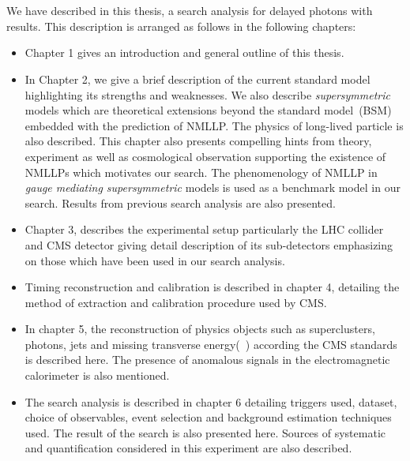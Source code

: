 \paragraph*{} \mbox{}\\
We have described in this thesis, a search analysis for delayed photons with results. This description is arranged as follows in the following chapters: 
\begin{itemize}
\item Chapter 1 gives an introduction and general outline of this thesis. 

\item In Chapter 2, we give a brief description of the current standard model highlighting its strengths and weaknesses. We also describe \textit{supersymmetric} models which are theoretical extensions beyond the standard model~(BSM) embedded with the prediction of NMLLP.
The physics of long-lived particle is also described.
This chapter also presents compelling hints from theory, experiment as well as cosmological observation supporting the existence of NMLLPs which motivates our search.
The phenomenology of NMLLP in \textit{gauge mediating supersymmetric} models is used as a benchmark model in our search. Results from previous search analysis are also presented. 

\item  Chapter 3,  describes the experimental setup particularly the LHC collider and CMS detector giving detail description of its sub-detectors emphasizing on those which have been used in our search analysis.

\item Timing reconstruction and calibration is described in chapter 4, detailing the method of extraction and calibration procedure used by CMS.  
\item In chapter 5, the reconstruction of physics objects such as superclusters, photons, jets and missing transverse energy(~\MET) according the CMS standards is described here. The presence of anomalous signals in the electromagnetic calorimeter is also mentioned.

\item The search analysis is described in chapter 6 detailing triggers used, dataset, choice of observables, event selection and background estimation techniques used. The result of the search is also presented here. Sources of systematic and quantification considered in this experiment are also described.


\end{itemize}
